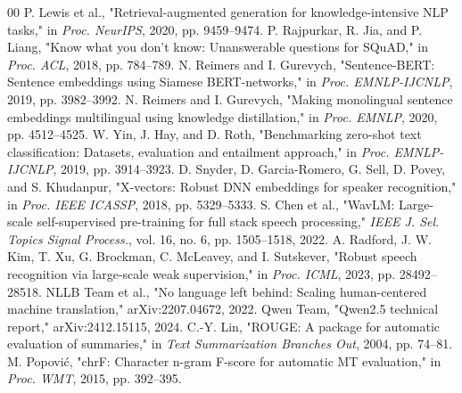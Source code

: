 \documentclass[conference]{IEEEtran}
\begin{document}
\begin{thebibliography}{00}
 P. Lewis et al., "Retrieval-augmented generation for knowledge-intensive NLP tasks," in \textit{Proc. NeurIPS}, 2020, pp. 9459--9474.
 P. Rajpurkar, R. Jia, and P. Liang, "Know what you don't know: Unanswerable questions for SQuAD," in \textit{Proc. ACL}, 2018, pp. 784--789.
 N. Reimers and I. Gurevych, "Sentence-BERT: Sentence embeddings using Siamese BERT-networks," in \textit{Proc. EMNLP-IJCNLP}, 2019, pp. 3982--3992.
 N. Reimers and I. Gurevych, "Making monolingual sentence embeddings multilingual using knowledge distillation," in \textit{Proc. EMNLP}, 2020, pp. 4512--4525.
 W. Yin, J. Hay, and D. Roth, "Benchmarking zero-shot text classification: Datasets, evaluation and entailment approach," in \textit{Proc. EMNLP-IJCNLP}, 2019, pp. 3914--3923.
 D. Snyder, D. Garcia-Romero, G. Sell, D. Povey, and S. Khudanpur, "X-vectors: Robust DNN embeddings for speaker recognition," in \textit{Proc. IEEE ICASSP}, 2018, pp. 5329--5333.
 S. Chen et al., "WavLM: Large-scale self-supervised pre-training for full stack speech processing," \textit{IEEE J. Sel. Topics Signal Process.}, vol. 16, no. 6, pp. 1505--1518, 2022.
 A. Radford, J. W. Kim, T. Xu, G. Brockman, C. McLeavey, and I. Sutskever, "Robust speech recognition via large-scale weak supervision," in \textit{Proc. ICML}, 2023, pp. 28492--28518.
 NLLB Team et al., "No language left behind: Scaling human-centered machine translation," arXiv:2207.04672, 2022.
 Qwen Team, "Qwen2.5 technical report," arXiv:2412.15115, 2024.
 C.-Y. Lin, "ROUGE: A package for automatic evaluation of summaries," in \textit{Text Summarization Branches Out}, 2004, pp. 74--81.
 M. Popović, "chrF: Character n-gram F-score for automatic MT evaluation," in \textit{Proc. WMT}, 2015, pp. 392--395.
\end{thebibliography}
\end{document}
